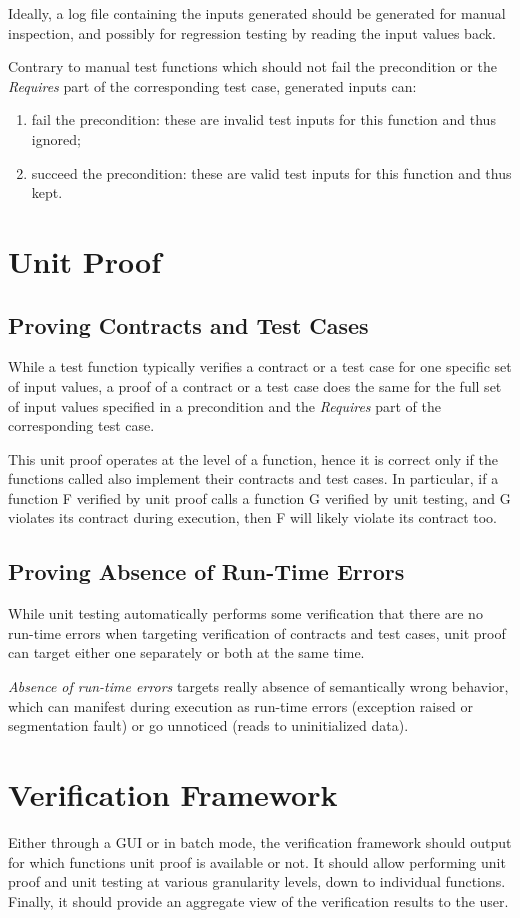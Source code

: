 \documentclass{article}
\begin{document}
Ideally, a log file containing the inputs generated should be generated for
manual inspection, and possibly for regression testing by reading the input
values back.

Contrary to manual test functions which should not fail the precondition or
the \textit{Requires} part of the corresponding test case, generated inputs
can:
\begin{enumerate}
\item fail the precondition: these are invalid test inputs for this
  function and thus ignored;
\item succeed the precondition: these are valid test inputs for this function
  and thus kept.
\end{enumerate}

\section{Unit Proof}

\subsection{Proving Contracts and Test Cases}

While a test function typically verifies a contract or a test case for one
specific set of input values, a proof of a contract or a test case does the
same for the full set of input values specified in a precondition and the
\textit{Requires} part of the corresponding test case.

This unit proof operates at the level of a function, hence it is correct only
if the functions called also implement their contracts and test cases. In
particular, if a function F verified by unit proof calls a function G
verified by unit testing, and G violates its contract during execution, then F
will likely violate its contract too.

\subsection{Proving Absence of Run-Time Errors}

While unit testing automatically performs some verification that there are no
run-time errors when targeting verification of contracts and test cases, unit
proof can target either one separately or both at the same time.

\textit{Absence of run-time errors} targets really absence of semantically
wrong behavior, which can manifest during execution as run-time errors
(exception raised or segmentation fault) or go unnoticed (reads to
uninitialized data).

\section{Verification Framework}

Either through a GUI or in batch mode, the verification framework should output
for which functions unit proof is available or not. It should allow
performing unit proof and unit testing at various granularity levels, down to
individual functions. Finally, it should provide an aggregate view of the
verification results to the user.
\end{document}
